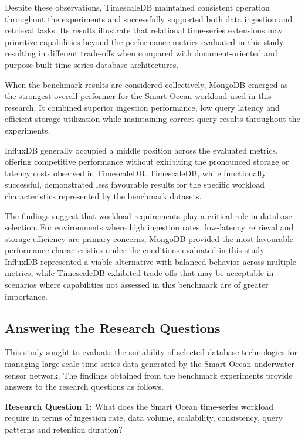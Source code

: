 Despite these observations, TimescaleDB maintained consistent operation throughout the experiments and successfully supported both data ingestion and retrieval tasks. Its results illustrate that relational time-series extensions may prioritize capabilities beyond the performance metrics evaluated in this study, resulting in different trade-offs when compared with document-oriented and purpose-built time-series database architectures.



When the benchmark results are considered collectively, MongoDB emerged as the strongest overall performer for the Smart Ocean workload used in this research. It combined superior ingestion performance, low query latency and efficient storage utilization while maintaining correct query results throughout the experiments.


InfluxDB generally occupied a middle position across the evaluated metrics, offering competitive performance without exhibiting the pronounced storage or latency costs observed in TimescaleDB. TimescaleDB, while functionally successful, demonstrated less favourable results for the specific workload characteristics represented by the benchmark datasets.


The findings suggest that workload requirements play a critical role in database selection. For environments where high ingestion rates, low-latency retrieval and storage efficiency are primary concerns, MongoDB provided the most favourable performance characteristics under the conditions evaluated in this study. InfluxDB represented a viable alternative with balanced behavior across multiple metrics, while TimescaleDB exhibited trade-offs that may be acceptable in scenarios where capabilities not assessed in this benchmark are of greater importance.


\subsection{Answering the Research Questions}
This study sought to evaluate the suitability of selected database technologies for managing large-scale time-series data generated by the Smart Ocean underwater sensor network. The findings obtained from the benchmark experiments provide answers to the research questions as follows.

\textbf{Research Question 1:} What does the Smart Ocean time-series workload require in terms of ingestion rate, data volume, scalability, consistency, query patterns and retention duration?

